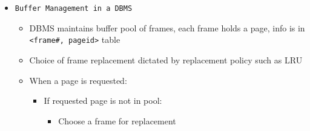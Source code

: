 \documentclass[landscape,8pt]{extarticle}
\newcommand{\code}{\lstinline}
\begin{document}
\begin{multicols}{5}
\begin{itemize}
\begin{itemize}
                  \item Level 3: Bit-interleaved parity
                        \begin{itemize}
                            \item Striping Unit: one bit (or byte) (one check disk)
                            \item Each read and write request involves all disks; disk array can process one request at a time
                        \end{itemize}
                  \item Level 4: Block-interleaved parity
                        \begin{itemize}
                            \item Striping unit: one disk block (one check disk)
                            \item Parallel reads possible for small requests, large requests can utilize full bandwidth
                            \item Writes involve modified block \emph{and} check disk
                        \end{itemize}
                  \item Level 5: Block-interleaved distributed parity
                        \begin{itemize}
                            \item Similar to RAID level 4 but parity blocks are distributed over all disks
                        \end{itemize}
              \end{itemize}
        \item \code{Buffer Management in a DBMS}
              \begin{itemize}
                  \item DBMS maintains buffer pool of frames, each frame holds a page, info is in \code{<frame#, pageid>} table
                  \item Choice of frame replacement dictated by replacement policy such as LRU
                  \item When a page is requested:
                        \begin{itemize}
                            \item If requested page is not in pool:
                                  \begin{itemize}
                                      \item Choose a frame for replacement

\end{itemize}
\end{itemize}
\end{itemize}
\end{itemize}
\end{multicols}
\end{document}

